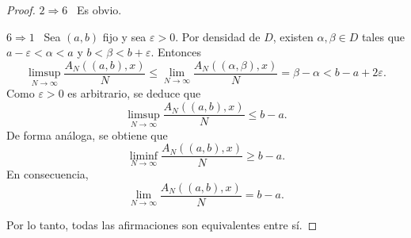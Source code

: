 \begin{proof}
    $2 \Longrightarrow 6$ \, Es obvio.

    $6 \Longrightarrow 1$ \, Sea $(a,b)$ fijo y sea $\varepsilon > 0$. Por densidad de $D$,
    existen $\alpha, \beta \in D$ tales que $a-\varepsilon < \alpha < a$ y $b < \beta < b+\varepsilon$.
    Entonces
    \[
        \limsup_{N \to \infty} \frac{A_N((a,b), x)}{N} \leq
        \lim_{N \to \infty} \frac{A_N((\alpha,\beta), x)}{N} = 
        \beta - \alpha <
        b - a + 2\varepsilon.
    \]
    Como $\varepsilon > 0$ es arbitrario, se deduce que 
    \[
        \limsup_{N \to \infty} \frac{A_N((a,b), x)}{N} \leq b - a.
    \]
    De forma análoga, se obtiene que 
    \[
        \liminf_{N \to \infty} \frac{A_N((a,b), x)}{N} \geq b - a.
    \]
    En consecuencia, 
    \[
        \lim_{N \to \infty} \frac{A_N((a,b), x)}{N} = b - a.
    \]

    Por lo tanto, todas las afirmaciones son equivalentes entre sí.
\end{proof}